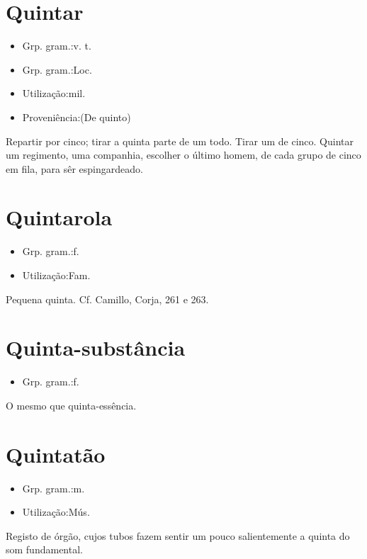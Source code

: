 \section{Quintar}
\begin{itemize}
\item {Grp. gram.:v. t.}
\end{itemize}
\begin{itemize}
\item {Grp. gram.:Loc.}
\end{itemize}
\begin{itemize}
\item {Utilização:mil.}
\end{itemize}
\begin{itemize}
\item {Proveniência:(De \textunderscore quinto\textunderscore )}
\end{itemize}
Repartir por cinco; tirar a quinta parte de um todo.
Tirar um de cinco.
\textunderscore Quintar um regimento, uma companhia\textunderscore , escolher o último homem, de cada grupo de cinco em fila, para sêr espingardeado.
\section{Quintarola}
\begin{itemize}
\item {Grp. gram.:f.}
\end{itemize}
\begin{itemize}
\item {Utilização:Fam.}
\end{itemize}
Pequena quinta. Cf. Camillo, \textunderscore Corja\textunderscore , 261 e 263.
\section{Quinta-substância}
\begin{itemize}
\item {Grp. gram.:f.}
\end{itemize}
O mesmo que \textunderscore quinta-essência\textunderscore .
\section{Quintatão}
\begin{itemize}
\item {Grp. gram.:m.}
\end{itemize}
\begin{itemize}
\item {Utilização:Mús.}
\end{itemize}
Registo de órgão, cujos tubos fazem sentir um pouco salientemente a quinta do som fundamental.
